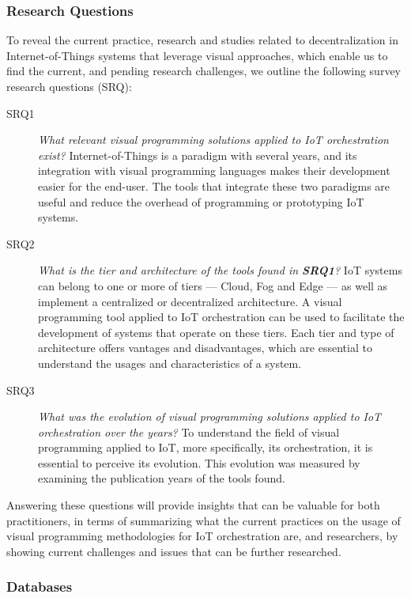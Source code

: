 \subsubsection{Research Questions}\label{sec:slr_research_questions}

To reveal the current practice, research and studies related to decentralization in Internet-of-Things systems that leverage visual approaches, which enable us to find the current, and pending research challenges, we outline the following survey research questions (SRQ):

\begin{description}
    \item[SRQ1] \textit{What relevant visual programming solutions applied to IoT orchestration exist?} Internet-of-Things is a paradigm with several years, and its integration with visual programming languages makes their development easier for the end-user. The tools that integrate these two paradigms are useful and reduce the overhead of programming or prototyping IoT systems.
    \item[SRQ2] \textit{What is the tier and architecture of the tools found in \textbf{SRQ1}?} IoT systems can belong to one or more of tiers --- Cloud, Fog and Edge --- as well as implement a centralized or decentralized architecture. A visual programming tool applied to IoT orchestration can be used to facilitate the development of systems that operate on these tiers. Each tier and type of architecture offers vantages and disadvantages, which are essential to understand the usages and characteristics of a system.
    \item[SRQ3] \textit{What was the evolution of visual programming solutions applied to IoT orchestration over the years?} To understand the field of visual programming applied to IoT, more specifically, its orchestration, it is essential to perceive its evolution. This evolution was measured by examining the publication years of the tools found.
\end{description}

Answering these questions will provide insights that can be valuable for both practitioners, in terms of summarizing what the current practices on the usage of visual programming methodologies for IoT orchestration are, and researchers, by showing current challenges and issues that can be further researched. 

\subsubsection{Databases}\label{sec:databases}

